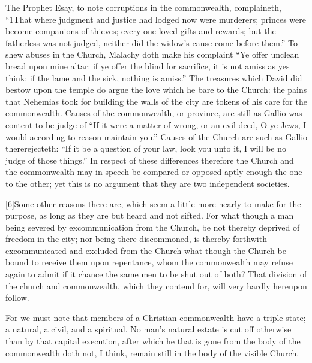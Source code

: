The Prophet Esay, to note corruptions in the commonwealth, complaineth, “1That where judgment and justice had lodged now were murderers; princes were become companions of thieves; every one loved gifts and rewards; but the fatherless was not judged, neither did the widow’s cause come before them.” To shew abuses in the Church, Malachy doth make his complaint “Ye offer unclean bread upon mine altar: if ye offer the blind for sacrifice, it is not amiss as yes think; if the lame and the sick, nothing is amiss.” The treasures which David did bestow upon the temple do argue the love which he bare to the Church: the pains that Nehemias took for building the walls of the city are tokens of his care for the commonwealth. Causes of the commonwealth, or province, are still as Gallio was content to be judge of “If it were a matter of wrong, or an evil deed, O ye Jews, I would according to reason maintain you.” Causes of the Church are such as Gallio thererejecteth: “If it be a question of your law, look you unto it, I will be no judge of those things.” In respect of these  differences therefore the Church and the commonwealth may in speech be compared or opposed aptly enough the one to the other; yet this is no argument that they are two independent societies.

[6]Some other reasons there are, which seem a little more nearly to make for the purpose, as long as they are but heard and not sifted. For what though a man being severed by excommunication from the Church, be not thereby deprived of freedom in the city; nor being there discommoned, is thereby forthwith excommunicated and excluded from the Church what though the Church be bound to receive them upon repentance, whom the commonwealth may refuse again to admit if it chance the same men to be shut out of both? That division of the church and commonwealth, which they contend for, will very hardly hereupon follow.

For we must note that members of a Christian commonwealth have a triple state; a natural, a civil, and a spiritual. No man’s natural estate is cut off otherwise than by that capital execution, after which he that is gone from the body of the commonwealth doth not, I think, remain still in the body of the visible Church.

